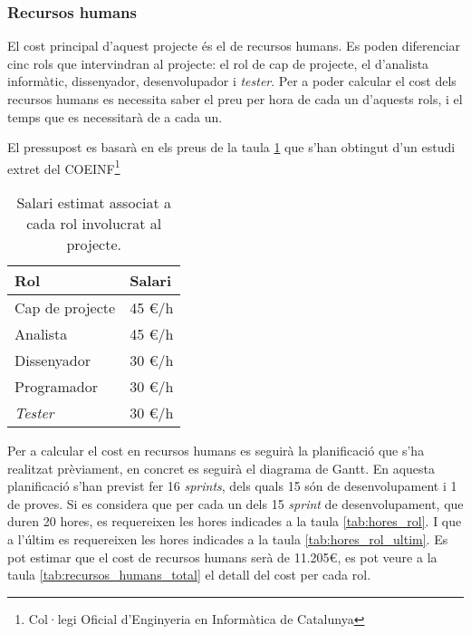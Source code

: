 \subsubsection{Recursos humans}

El cost principal d'aquest projecte és el de recursos humans. Es poden diferenciar cinc rols que intervindran al projecte: el rol de cap de projecte, el d'analista informàtic, dissenyador, desenvolupador i \textit{tester}. Per a poder calcular el cost dels recursos humans es necessita saber el preu per hora de cada un d'aquests rols, i el temps que es necessitarà de a cada un.

El pressupost es basarà en els preus de la taula \ref{tab:salari} que s'han obtingut d'un estudi extret del COEINF\footnote{Col·legi Oficial d'Enginyeria en Informàtica de Catalunya}\cite{remuneracion}

\begin{table}[ht]
    \begin{center}
    \begin{tabular}{| l | l |}
        \hline
            \textbf{Rol}   &   \textbf{Salari}  \\ 
        \hline 
            Cap de projecte     &   45 \euro/h  \\
            Analista            &   45 \euro/h  \\
            Dissenyador         &   30 \euro/h  \\
            Programador         &   30 \euro/h  \\
            \textit{Tester}     &   30 \euro/h  \\
        \hline
    \end{tabular}
    \end{center}
    \caption{Salari estimat associat a cada rol involucrat al projecte. \label{tab:salari}}
\end{table}

Per a calcular el cost en recursos humans es seguirà la planificació que s'ha realitzat prèviament, en concret es seguirà el diagrama de Gantt.
En aquesta planificació s'han previst fer 16 \textit{sprints}, dels quals 15 són de desenvolupament i 1 de proves.
Si es considera que per cada un dels 15 \textit{sprint} de desenvolupament, que duren 20 hores, es requereixen les hores indicades a la taula \ref{tab:hores_rol}. I que a l'últim es requereixen les hores indicades a la taula \ref{tab:hores_rol_ultim}. Es pot estimar que el cost de recursos humans serà de 11.205\euro, es pot veure a la taula \ref{tab:recursos_humans_total} el detall del cost per cada rol.

